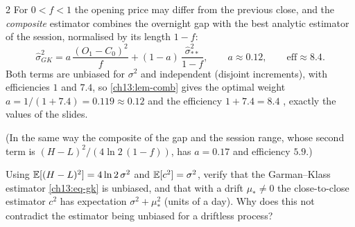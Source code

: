 \begin{paracol}{2}
For $0<f<1$ the opening price may differ from the previous close, and the \emph{composite} estimator combines the overnight gap with the
best analytic estimator of the session, normalised by its length $1-f$:
\begin{equation}\label{ch13:eq-gkcomp}
  \hat\sigma^2_{G K}=a\,\frac{(O_1-C_0)^2}{f}+(1-a)\,\frac{\hat\sigma^2_{**}}{1-f},\qquad a\approx0.12,\qquad
  \mathrm{eff}\approx8.4 .
\end{equation}
Both terms are unbiased for $\sigma^2$ and independent (disjoint increments), with efficiencies $1$ and $7.4$, so
\cref{ch13:lem-comb} gives the optimal weight $a=1/(1+7.4)=0.119\approx0.12$ and the efficiency $1+7.4=8.4$ , exactly the values of
the slides.
\begin{secondary}
(In the same way the composite of the gap and the session range, whose second term is
$(H-L)^2/(4\ln2\,(1-f))$, has $a=0.17$ and efficiency $5.9$.)
\end{secondary}

\begin{exercise}\label{ch13:ex-extra2}
Using $\mathbb{E}[(H-L)^2]=4\ln2\,\sigma^2$ and $\mathbb{E}[c^2]=\sigma^2$, verify that the Garman--Klass estimator \eqref{ch13:eq-gk} is unbiased, and that with a drift $\mu_*\ne0$ the close-to-close estimator $c^2$ has expectation $\sigma^2+\mu_*^2$ (units of a day). Why does this not contradict the estimator being unbiased for a driftless process?
\end{exercise}


\end{paracol}
